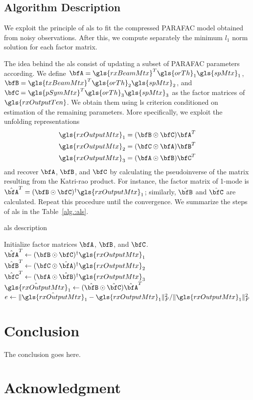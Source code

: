 \documentclass[conference]{IEEEtran}
\begin{document}
\subsection{Algorithm Description}

We exploit the principle of \gls{als} to fit the compressed \gls{PARAFAC} model
obtained from noisy observations. After this, we compute separately the minimum $l_1$ norm
solution for each factor matrix.

The idea behind the \gls{als} consist of updating a subset of \gls{PARAFAC} parameters
according. We define $\bfA =
\gls{rxBeamMtx}^T\gls{orTh}_1\gls{spMtx}_1$, $\bfB =
\gls{txBeamMtx}^T\gls{orTh}_2\gls{spMtx}_2$, and $\bfC =
\gls{pSymMtx}^T\gls{orTh}_3\gls{spMtx}_3$   as the factor matrices of
$\gls{rxOutputTen}$. We obtain them using \gls{ls} criterion conditioned on estimation of the remaining
parameters. More specifically, we exploit the unfolding representations
\begin{align}
 \gls{rxOutputMtx}_1 = (\bfB \odot \bfC)\bfA^T \\
 \gls{rxOutputMtx}_2 = (\bfC \odot \bfA)\bfB^T \\
 \gls{rxOutputMtx}_3 = (\bfA \odot \bfB)\bfC^T
\end{align}
and recover $\bfA$, $\bfB$, and $\bfC$ by calculating the pseudoinverse of the
matrix resulting from the Katri-rao product. For instance, the factor matrix of
1-mode is $\hat{\bfA}^T = (\bfB \odot \bfC)^{\dagger}\gls{rxOutputMtx}_1 $;
similarly, $\hat{\bfB}$ and $\hat{\bfC}$ are calculated. Repeat this procedure
until the convergence. We summarize the steps of \gls{als} in the Table~\ref{alg.:als}. 

\label{sec:algorithm}
\begin{algorithm}
    \caption{\gls{als} description } \label{alg.:als}
    \begin{algorithmic}
      \STATE Initialize factor matrices $\bfA$, $\bfB$, and $\bfC$.
      \STATE $\hat{\bfA}^T \gets (\bfB \odot \bfC)^{\dagger}\gls{rxOutputMtx}_1 $
      \STATE $\hat{\bfB}^T \gets (\bfC \odot \hat{\bfA})^{\dagger}\gls{rxOutputMtx}_2 $
      \STATE $\hat{\bfC}^T \gets ({\bfA} \odot \hat{\bfB})^{\dagger}\gls{rxOutputMtx}_3 $
      \STATE $\hat{\gls{rxOutputMtx}}_1 \gets (\hat{\bfB} \odot \hat{\bfC})\hat{\bfA}^T$
      \STATE $ e \gets \|\hat{\gls{rxOutputMtx}}_1 - \gls{rxOutputMtx}_1 \|^2_F/ \|\gls{rxOutputMtx}_1\|_F^2$
      \ENDWHILE
    \end{algorithmic}
\end{algorithm}





\section{Conclusion}
The conclusion goes here.

\section*{Acknowledgment}



\end{document}
